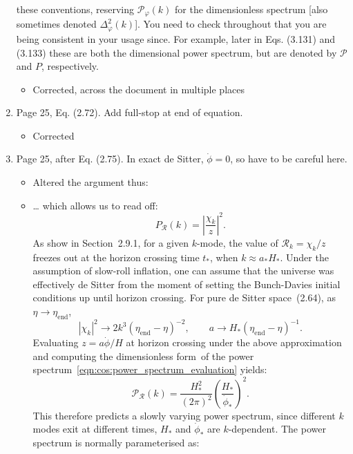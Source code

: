 \documentclass[11pt]{article}
\begin{document}
\begin{enumerate}
  these conventions, reserving $\mathcal{P}_\varphi(k)$ for the
  dimensionless spectrum [also sometimes denoted
  $\Delta_\varphi^2(k)$]. You need to check throughout that you are
  being consistent in your usage since. For example, later in
  Eqs. (3.131) and (3.133) these are both the dimensional power
  spectrum, but are denoted by $\mathcal{P}$ and $P$, respectively.
\begin{itemize}
    \item Corrected, across the document in multiple places
\end{itemize}
\item Page 25, Eq. (2.72). Add full-stop at end of equation.
  \begin{itemize}
    \item Corrected
  \end{itemize}
\item Page 25, after Eq. (2.75). In exact de Sitter, $\dot{\phi} = 0$,
  so have to be careful here.
  \begin{itemize}
      \item Altered the argument thus:
      \item \ldots 
which allows us to read off:
\begin{equation}
  P_\mathcal{R}(k) = {\left|\frac{\chi_k}{z}\right|}^2.
  \label{eqn:cos:power_spectrum_evaluation}
  \tag{2.74}
\end{equation}
As show in Section~2.9.1, for a given \(k\)-mode, the value of \(\mathcal{R}_k = \chi_k/z\) freezes out at the horizon crossing time \(t_*\), when \(k\approx a_*H_*\). Under the assumption of slow-roll inflation, one can assume that the universe was effectively de Sitter from the moment of setting the Bunch-Davies initial conditions up until horizon crossing. For pure de Sitter space~(2.64), as \(\eta\to\eta_\mathrm{end}\),
\begin{equation}
  |\chi_k|^2 \rightarrow 2k^3 {(\eta_\mathrm{end}-\eta)}^{-2},\qquad
  a \rightarrow H_*{(\eta_\mathrm{end}-\eta)}^{-1}.
  \tag{2.75}
\end{equation}
Evaluating \(z = a \dot{\phi} / H\) at horizon crossing under the above approximation and computing the dimensionless form~of the power spectrum~\eqref{eqn:cos:power_spectrum_evaluation} yields:
\begin{equation}
    \mathcal{P}_\mathcal{R}(k) = \frac{H_*^2}{{(2\pi)}^2}{\left( \frac{H_*}{\dot{\phi}_*} \right)}^2.
  \label{eqn:cos:inflation_power}
  \tag{2.76}
\end{equation}
This therefore predicts a slowly varying power spectrum, since different \(k\) modes exit at different times, \(H_*\) and \(\dot{\phi}_*\) are \(k\)-dependent. The power spectrum is normally parameterised as:

\end{itemize}
\end{enumerate}
\end{document}
